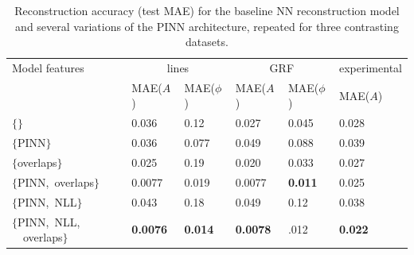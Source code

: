 \documentclass[sn-mathphys]{sn-jnl}%
\theoremstyle{thmstyleone}%
\theoremstyle{thmstyletwo}%
\theoremstyle{thmstylethree}%
\begin{document}
\begin{table}[h]
\begin{center}
\caption{Reconstruction accuracy (test MAE) for the baseline NN reconstruction model and several variations of the PINN architecture, repeated for three contrasting datasets. }\label{tab1}%
\begin{tabular}{p{2cm}llllll}
\toprule 
    Model features & \multicolumn{2}{c}{lines} & \multicolumn{2}{c}{GRF} & \multicolumn{2}{c}{experimental}\\
    & MAE($A$) & MAE($\phi$)
    & MAE($A$) & MAE($\phi$)
    & MAE($A$) \\%
    \midrule
$\{\}$ \footnotemark[1]    & 0.036   & 0.12  & 0.027 & 0.045 & 0.028 \\
$\{\mathrm{PINN}  \}$  & 0.036   & 0.077 & 0.049 & 0.088 & 0.039 \\
$\{$overlaps$\}$  & 0.025 & 0.19 &  0.020 & 0.033 & 0.027 \\
$\{$PINN,~overlaps$\}$   & 0.0077 & 0.019 & 0.0077 & \bf{0.011} & 0.025 \\
  $\{$PINN,~NLL$\}$     & 0.043    &   0.18  & 0.049 & 0.12 &  0.038 \\
  $\{$PINN,~NLL,\newline
 ~~overlaps$\}$     & \bf{0.0076}    &   \bf{0.014}  & \bf{0.0078} & .012 &  \bf{0.022}  \\
    \bottomrule
\end{tabular}
\end{center}
\end{table}
\end{document}
